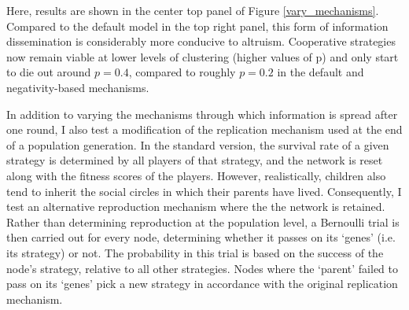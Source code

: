 \documentclass{JASSS}
\begin{document}
Here, results are shown in the center top panel of Figure \ref{vary_mechanisms}. Compared to the default model in the top right panel, this form of information dissemination is considerably more conducive to altruism. Cooperative strategies now remain viable at lower levels of clustering (higher values of p) and only start to die out around $p=0.4$, compared to roughly $p=0.2$ in the default and negativity-based mechanisms.

In addition to varying the mechanisms through which information is spread after one round, I also test a modification of the replication mechanism used at the end of a population generation. In the standard version, the survival rate of a given strategy is determined by all players of that strategy, and the network is reset along with the fitness scores of the players. However, realistically, children also tend to inherit the social circles in which their parents have lived. Consequently, I test an alternative reproduction mechanism where the the network is retained. Rather than determining reproduction at the population level, a Bernoulli trial is then carried out for every node, determining whether it passes on its `genes' (i.e. its strategy) or not. The probability in this trial is based on the success of the node's strategy, relative to all other strategies. Nodes where the `parent' failed to pass on its `genes' pick a new strategy in accordance with the original replication mechanism.
\end{document}
